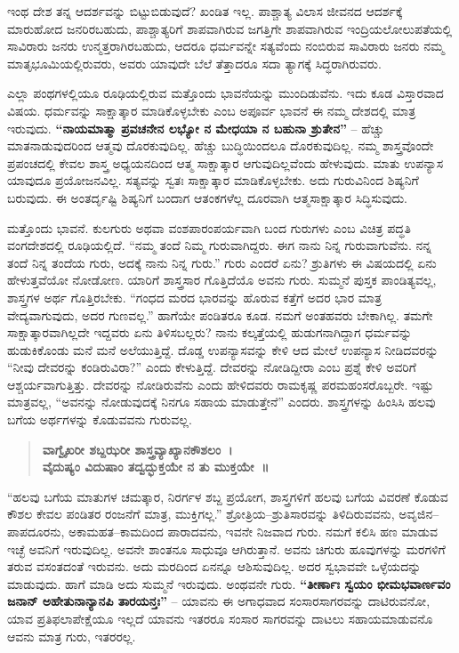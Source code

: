 ಇಂಥ ದೇಶ ತನ್ನ ಆದರ್ಶವನ್ನು ಬಿಟ್ಟುಬಿಡುವುದೆ? ಖಂಡಿತ ಇಲ್ಲ. ಪಾಶ್ಚಾತ್ಯ ವಿಲಾಸ ಜೀವನದ ಆದರ್ಶಕ್ಕೆ ಮಾರುಹೋದ ಜನರಿರಬಹುದು, ಪಾಶ್ಚಾತ್ಯರಿಗೆ ಶಾಪವಾಗಿರುವ ಜಗತ್ತಿಗೇ ಶಾಪವಾಗಿರುವ ಇಂದ್ರಿಯಲೋಲುಪತೆಯಲ್ಲಿ ಸಾವಿರಾರು ಜನರು ಉನ್ಮತ್ತರಾಗಿರಬಹುದು, ಆದರೂ ಧರ್ಮವನ್ನೇ ಸತ್ಯವೆಂದು ನಂಬಿರುವ ಸಾವಿರಾರು ಜನರು ನಮ್ಮ ಮಾತೃಭೂಮಿಯಲ್ಲಿರುವರು, ಅವರು ಯಾವುದೇ ಬೆಲೆ ತೆತ್ತಾದರೂ ಸದಾ ತ್ಯಾಗಕ್ಕೆ ಸಿದ್ಧರಾಗಿರುವರು.

ಎಲ್ಲಾ ಪಂಥಗಳಲ್ಲಿಯೂ ರೂಢಿಯಲ್ಲಿರುವ ಮತ್ತೊಂದು ಭಾವನೆಯನ್ನು ಮುಂದಿಡುವೆನು. ಇದು ಕೂಡ ವಿಸ್ತಾರವಾದ ವಿಷಯ. ಧರ್ಮವನ್ನು ಸಾಕ್ಷಾತ್ಕಾರ ಮಾಡಿಕೊಳ್ಳಬೇಕು ಎಂಬ ಅಪೂರ್ವ ಭಾವನೆ ಈ ನಮ್ಮ ದೇಶದಲ್ಲಿ ಮಾತ್ರ ಇರುವುದು. \textbf{“ನಾಯಮಾತ್ಮಾ ಪ್ರವಚನೇನ ಲಭ್ಯೋ ನ ಮೇಧಯಾ ನ ಬಹುನಾ ಶ್ರುತೇನ”} – ಹೆಚ್ಚು ಮಾತನಾಡುವುದರಿಂದ ಆತ್ಮವು ದೊರಕುವುದಿಲ್ಲ. ಹೆಚ್ಚು ಬುದ್ಧಿಯಿಂದಲೂ ದೊರಕುವುದಿಲ್ಲ. ನಮ್ಮ ಶಾಸ್ತ್ರವೊಂದೇ ಪ್ರಪಂಚದಲ್ಲಿ ಕೇವಲ ಶಾಸ್ತ್ರ ಅಧ್ಯಯನದಿಂದ ಆತ್ಮ ಸಾಕ್ಷಾತ್ಕಾರ ಆಗುವುದಿಲ್ಲವೆಂದು ಹೇಳುವುದು. ಮಾತು ಉಪನ್ಯಾಸ ಯಾವುದೂ ಪ್ರಯೋಜನವಿಲ್ಲ. ಸತ್ಯವನ್ನು ಸ್ವತಃ ಸಾಕ್ಷಾತ್ಕಾರ ಮಾಡಿಕೊಳ್ಳಬೇಕು. ಅದು ಗುರುವಿನಿಂದ ಶಿಷ್ಯನಿಗೆ ಬರುವುದು. ಈ ಅಂತರ್ದೃಷ್ಟಿ ಶಿಷ್ಯನಿಗೆ ಬಂದಾಗ ಆತಂಕಗಳೆಲ್ಲ ದೂರವಾಗಿ ಆತ್ಮಸಾಕ್ಷಾತ್ಕಾರ ಸಿದ್ಧಿಸುವುದು.

ಮತ್ತೊಂದು ಭಾವನೆ. ಕುಲಗುರು ಅಥವಾ ವಂಶಪಾರಂಪರ್ಯವಾಗಿ ಬಂದ ಗುರುಗಳು ಎಂಬ ವಿಚಿತ್ರ ಪದ್ಧತಿ ವಂಗದೇಶದಲ್ಲಿ ರೂಢಿಯಲ್ಲಿದೆ. “ನಮ್ಮ ತಂದೆ ನಿಮ್ಮ ಗುರುವಾಗಿದ್ದರು. ಈಗ ನಾನು ನಿನ್ನ ಗುರುವಾಗುವೆನು. ನನ್ನ ತಂದೆ ನಿನ್ನ ತಂದೆಯ ಗುರು, ಅದಕ್ಕೆ ನಾನು ನಿನ್ನ ಗುರು.” ಗುರು ಎಂದರೆ ಏನು? ಶ್ರುತಿಗಳು ಈ ವಿಷಯದಲ್ಲಿ ಏನು ಹೇಳುತ್ತವೆಯೋ ನೋಡೋಣ. ಯಾರಿಗೆ ಶಾಸ್ತ್ರಸಾರ ಗೊತ್ತಿದೆಯೊ ಅವನು ಗುರು. ಸುಮ್ಮನೆ ಪುಸ್ತಕ ಪಾಂಡಿತ್ಯವಲ್ಲ, ಶಾಸ್ತ್ರಗಳ ಅರ್ಥ ಗೊತ್ತಿರಬೇಕು. “ಗಂಧದ ಮರದ ಭಾರವನ್ನು ಹೊರುವ ಕತ್ತೆಗೆ ಅದರ ಭಾರ ಮಾತ್ರ ವೇದ್ಯವಾಗುವುದು, ಅದರ ಗುಣವಲ್ಲ.” ಹಾಗೆಯೇ ಪಂಡಿತರೂ ಕೂಡ. ನಮಗೆ ಅಂತಹವರು ಬೇಕಾಗಿಲ್ಲ. ತಮಗೇ ಸಾಕ್ಷಾತ್ಕಾರವಾಗಿಲ್ಲದೇ ಇದ್ದವರು ಏನು ತಿಳಿಸಬಲ್ಲರು? ನಾನು ಕಲ್ಕತ್ತೆಯಲ್ಲಿ ಹುಡುಗನಾಗಿದ್ದಾಗ ಧರ್ಮವನ್ನು ಹುಡುಕಿಕೊಂಡು ಮನೆ ಮನೆ ಅಲೆಯುತ್ತಿದ್ದೆ. ದೊಡ್ಡ ಉಪನ್ಯಾಸವನ್ನು ಕೇಳಿ ಆದ ಮೇಲೆ ಉಪನ್ಯಾಸ ನೀಡಿದವರನ್ನು “ನೀವು ದೇವರನ್ನು ಕಂಡಿರುವಿರಾ?” ಎಂದು ಕೇಳುತ್ತಿದ್ದೆ. ದೇವರನ್ನು ನೋಡಿದ್ದೀರಾ ಎಂಬ ಪ್ರಶ್ನೆ ಕೇಳಿ ಅವರಿಗೆ ಆಶ್ಚರ್ಯವಾಗುತ್ತಿತ್ತು. ದೇವರನ್ನು ನೋಡಿರುವೆನು ಎಂದು ಹೇಳಿದವರು ರಾಮಕೃಷ್ಣ ಪರಮಹಂಸರೊಬ್ಬರೇ. ಇಷ್ಟು ಮಾತ್ರವಲ್ಲ, “ಅವನನ್ನು ನೋಡುವುದಕ್ಕೆ ನಿನಗೂ ಸಹಾಯ ಮಾಡುತ್ತೇನೆ” ಎಂದರು. ಶಾಸ್ತ್ರಗಳನ್ನು ಹಿಂಸಿಸಿ ಹಲವು ಬಗೆಯ ಅರ್ಥಗಳನ್ನು ಕೊಡುವವನು ಗುರುವಲ್ಲ.

\begin{verse}
\textbf{ವಾಗ್ವೈಖರೀ ಶಬ್ದಝರೀ ಶಾಸ್ತ್ರವ್ಯಾಖ್ಯಾನಕೌಶಲಂ~।}\\\textbf{ವೈದುಷ್ಯಂ ವಿದುಷಾಂ ತದ್ವದ್ಭುಕ್ತಯೇ ನ ತು ಮುಕ್ತಯೇ~॥}
\end{verse}

“ಹಲವು ಬಗೆಯ ಮಾತುಗಳ ಚಮತ್ಕಾರ, ನಿರರ್ಗಳ ಶಬ್ದ ಪ್ರಯೋಗ, ಶಾಸ್ತ್ರಗಳಿಗೆ ಹಲವು ಬಗೆಯ ವಿವರಣೆ ಕೊಡುವ ಕೌಶಲ ಕೇವಲ ಪಂಡಿತರ ರಂಜನೆಗೆ ಮಾತ್ರ, ಮುಕ್ತಿಗಲ್ಲ.” ಶ್ರೋತ್ರಿಯ–ಶ್ರುತಿಸಾರವನ್ನು ತಿಳಿದಿರುವವನು, ಅವೃಜಿನ–ಪಾಪದೂರನು, ಅಕಾಮಹತ–ಕಾಮದಿಂದ ಪಾರಾದವನು, ಇವನೇ ನಿಜವಾದ ಗುರು. ನಮಗೆ ಕಲಿಸಿ ಹಣ ಮಾಡುವ ಇಚ್ಛೆ ಅವನಿಗೆ ಇರುವುದಿಲ್ಲ. ಅವನೇ ಶಾಂತನೂ ಸಾಧುವೂ ಆಗಿರುತ್ತಾನೆ. ಅವನು ಚಿಗುರು ಹೂವುಗಳನ್ನು ಮರಗಳಿಗೆ ತರುವ ವಸಂತದಂತೆ ಇರುವನು. ಅದು ಮರದಿಂದ ಏನನ್ನೂ ಆಶಿಸುವುದಿಲ್ಲ. ಅದರ ಸ್ವಭಾವವೇ ಒಳ್ಳೆಯದನ್ನು ಮಾಡುವುದು. ಹಾಗೆ ಮಾಡಿ ಅದು ಸುಮ್ಮನೆ ಇರುವುದು. ಅಂಥವನೇ ಗುರು. \textbf{“ತೀರ್ಣಾಃ ಸ್ವಯಂ ಭೀಮಭವಾರ್ಣವಂ ಜನಾನ್​ ಅಹೇತುನಾನ್ಯಾನಪಿ ತಾರಯನ್ತಃ”} – ಯಾವನು ಈ ಅಗಾಧವಾದ ಸಂಸಾರಸಾಗರವನ್ನು ದಾಟಿರುವನೋ, ಯಾವ ಪ್ರತಿಫಲಾಪೇಕ್ಷೆಯೂ ಇಲ್ಲದೆ ಯಾವನು ಇತರರೂ ಸಂಸಾರ ಸಾಗರವನ್ನು ದಾಟಲು ಸಹಾಯಮಾಡುವನೊ ಆವನು ಮಾತ್ರ ಗುರು, ಇತರರಲ್ಲ.

